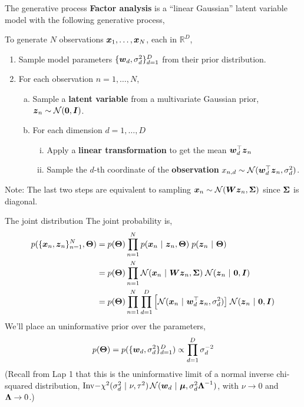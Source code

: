 \documentclass[aspectratio=169]{beamer}
\begin{document}
\begin{frame}{The generative process}
\textbf{Factor analysis} is a ``linear Gaussian'' latent variable model with the following generative process,

To generate $N$ observations $\boldsymbol{x}_1,\ldots, \boldsymbol{x}_N$, each in $\mathbb{R}^D$, 
\begin{enumerate}
    \item Sample model parameters $\{\boldsymbol{w}_d, \sigma_d^2\}_{d=1}^D$ from their prior distribution. 
    \item For each observation $n=1,\ldots,N$,
    \begin{enumerate}[a.]
        \item Sample a \textbf{latent variable} from a multivariate Gaussian prior, $\boldsymbol{z}_n \sim \mathcal{N}(\boldsymbol{0}, \boldsymbol{I})$.
        \item For each dimension $d=1,\ldots,D$
        \begin{enumerate}[i.]
        \item Apply a \textbf{linear transformation} to get the mean $\boldsymbol{w}_d^\top \boldsymbol{z}_n$
        \item Sample the $d$-th coordinate of the \textbf{observation} $x_{n,d} \sim \mathcal{N}(\boldsymbol{w}_d^\top \boldsymbol{z}_n, \sigma_d^2)$.
        \end{enumerate}
    \end{enumerate}
\end{enumerate}

Note: The last two steps are equivalent to sampling $\boldsymbol{x}_n \sim \mathcal{N}(\boldsymbol{W} \boldsymbol{z}_n, \boldsymbol{\Sigma})$ since $\boldsymbol{\Sigma}$ is diagonal.
\end{frame}

\begin{frame}{The joint distribution}
The joint probability is,
\begin{align}
    p(\{\boldsymbol{x}_n, \boldsymbol{z}_n\}_{n=1}^N, \boldsymbol{\Theta}) 
    &= p(\boldsymbol{\Theta}) \prod_{n=1}^N p(\boldsymbol{x}_n ~\vert~ \boldsymbol{z}_n, \boldsymbol{\Theta}) \; p(\boldsymbol{z}_n ~\vert~ \boldsymbol{\Theta}) \\
    \label{eq:fa-joint2}
    &= p(\boldsymbol{\Theta}) \prod_{n=1}^N \mathcal{N}(\boldsymbol{x}_n ~\vert~ \boldsymbol{W} \boldsymbol{z}_n, \boldsymbol{\Sigma}) \; \mathcal{N}(\boldsymbol{z}_n ~\vert~ \boldsymbol{0}, \boldsymbol{I}) \\
    &= p(\boldsymbol{\Theta}) \prod_{n=1}^N \prod_{d=1}^D \Big[ \mathcal{N}(\boldsymbol{x}_n ~\vert~ \boldsymbol{w}_d^\top \boldsymbol{z}_n, \sigma_d^2) \big] \; \mathcal{N}(\boldsymbol{z}_n ~\vert~ \boldsymbol{0}, \boldsymbol{I}) 
\end{align}
We'll place an uninformative prior over the parameters,
\begin{align}
    p(\boldsymbol{\Theta}) = p(\{\boldsymbol{w}_d, \sigma_d^2\}_{d=1}^D) 
    \propto \prod_{d=1}^D \sigma_d^{-2}
\end{align}
(Recall from Lap 1 that this is the uninformative limit of a normal inverse chi-squared distribution, $\mathrm{Inv-}\chi^2(\sigma_d^2 ~\vert~ \nu, \tau^2) \, \mathcal{N}(\boldsymbol{w}_d ~\vert~ \boldsymbol{\mu}, \sigma_d^2 \boldsymbol{\Lambda}^{-1})$, with $\nu \to 0$ and $\boldsymbol{\Lambda} \to 0$.)


\end{frame}
\end{document}

